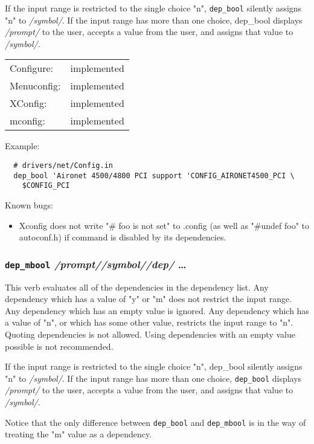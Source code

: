 If the input range is restricted to the single choice "n", \texttt{dep\_bool}
silently assigns "n" to \textit{/symbol/}.  If the input range has more than
one choice, dep\_bool displays \textit{/prompt/} to the user, accepts a value
from the user, and assigns that value to \textit{/symbol/}.

\begin{tabular}{ll}
Configure:  &implemented\\
Menuconfig: &implemented\\
XConfig:    &implemented\\
mconfig:    &implemented\\
\end{tabular}

Example:
{\small\begin{verbatim}
  # drivers/net/Config.in
  dep_bool 'Aironet 4500/4800 PCI support 'CONFIG_AIRONET4500_PCI \
    $CONFIG_PCI
\end{verbatim}}

Known bugs:
\begin{itemize}
\item Xconfig does not write "\# foo is not set" to .config (as well as
  "\#undef foo" to autoconf.h) if command is disabled by its dependencies.
\end{itemize}


\subsubsection{\texttt{dep\_mbool} \quad\textit{/prompt/}\quad \textit{/symbol/}\quad \textit{/dep/} \quad\dots}

This verb evaluates all of the dependencies in the dependency list.
Any dependency which has a value of "y" or "m" does not restrict the
input range.  Any dependency which has an empty value is ignored.
Any dependency which has a value of "n", or which has some other value,
restricts the input range to "n".  Quoting dependencies is not allowed.
Using dependencies with an empty value possible is not recommended.

If the input range is restricted to the single choice "n", dep\_bool
silently assigns "n" to \textit{/symbol/}.  If the input range has more than
one choice, \texttt{dep\_bool} displays \textit{/prompt/} to the user, accepts a value
from the user, and assigns that value to \textit{/symbol/}.

Notice that the only difference between \texttt{dep\_bool} and \texttt{dep\_mbool}
is in the way of treating the "m" value as a dependency.

